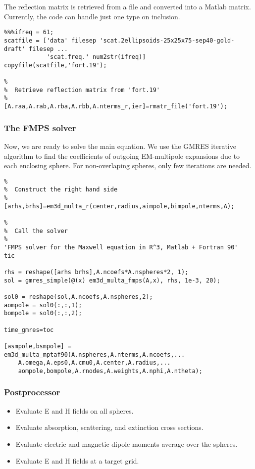 \documentclass{article}
\begin{document}
The reflection matrix is retrieved from a file and converted into a
Matlab matrix. Currently, the code can handle just one type on
inclusion.

\begin{verbatim}
%%%ifreq = 61;
scatfile = ['data' filesep 'scat.2ellipsoids-25x25x75-sep40-gold-draft' filesep ...
            'scat.freq.' num2str(ifreq)]
copyfile(scatfile,'fort.19');

%
%  Retrieve reflection matrix from 'fort.19'
%
[A.raa,A.rab,A.rba,A.rbb,A.nterms_r,ier]=rmatr_file('fort.19');
\end{verbatim}

\subsubsection{ The FMPS solver}

Now, we are ready to solve the main equation. We use the GMRES
iterative algorithm to find the coefficients of outgoing EM-multipole
expansions due to each enclosing sphere. For non-overlaping spheres,
only few iterations are needed.

\begin{verbatim}
%
%  Construct the right hand side
%
[arhs,brhs]=em3d_multa_r(center,radius,aimpole,bimpole,nterms,A);

%
%  Call the solver
%
'FMPS solver for the Maxwell equation in R^3, Matlab + Fortran 90'
tic

rhs = reshape([arhs brhs],A.ncoefs*A.nspheres*2, 1);
sol = gmres_simple(@(x) em3d_multa_fmps(A,x), rhs, 1e-3, 20);

sol0 = reshape(sol,A.ncoefs,A.nspheres,2);
aompole = sol0(:,:,1);
bompole = sol0(:,:,2);

time_gmres=toc

[asmpole,bsmpole] = em3d_multa_mptaf90(A.nspheres,A.nterms,A.ncoefs,...
    A.omega,A.eps0,A.cmu0,A.center,A.radius,...
    aompole,bompole,A.rnodes,A.weights,A.nphi,A.ntheta);
\end{verbatim}


\subsubsection{ Postprocessor}

\begin{itemize}

\item
Evaluate E and H fields on all spheres.

\item
Evaluate absorption, scattering, and extinction cross sections.

\item
Evaluate electric and magnetic dipole moments average over the
spheres.

\item
Evaluate E and H fields at a target grid.
\end{itemize}
\end{document}
